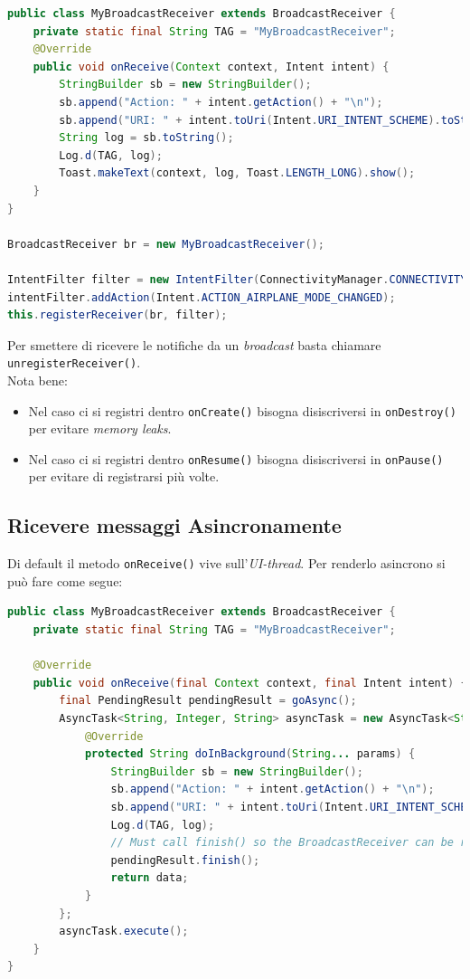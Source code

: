 \documentclass{book}
\begin{document}
\begin{lstlisting}[language=Java]
public class MyBroadcastReceiver extends BroadcastReceiver {
    private static final String TAG = "MyBroadcastReceiver";
    @Override
    public void onReceive(Context context, Intent intent) {
        StringBuilder sb = new StringBuilder();
        sb.append("Action: " + intent.getAction() + "\n");
        sb.append("URI: " + intent.toUri(Intent.URI_INTENT_SCHEME).toString() + "\n");
        String log = sb.toString();
        Log.d(TAG, log);
        Toast.makeText(context, log, Toast.LENGTH_LONG).show();
    }
}

BroadcastReceiver br = new MyBroadcastReceiver();

IntentFilter filter = new IntentFilter(ConnectivityManager.CONNECTIVITY_ACTION);
intentFilter.addAction(Intent.ACTION_AIRPLANE_MODE_CHANGED);
this.registerReceiver(br, filter);
\end{lstlisting}

Per smettere di ricevere le notifiche da un \textit{broadcast} basta chiamare \texttt{unregisterReceiver()}.\\
Nota bene:
\begin{itemize}
	\item Nel caso ci si registri dentro \texttt{onCreate()} bisogna disiscriversi in \texttt{onDestroy()} per evitare \textit{memory leaks}.
	\item Nel caso ci si registri dentro \texttt{onResume()} bisogna disiscriversi in \texttt{onPause()} per evitare di registrarsi più volte.
\end{itemize}


\subsection{Ricevere messaggi Asincronamente}
Di default il metodo \texttt{onReceive()} vive sull'\textit{UI-thread}. Per renderlo asincrono si può fare come segue:

\begin{lstlisting}[language=Java]
public class MyBroadcastReceiver extends BroadcastReceiver {
    private static final String TAG = "MyBroadcastReceiver";

    @Override
    public void onReceive(final Context context, final Intent intent) {
        final PendingResult pendingResult = goAsync();
        AsyncTask<String, Integer, String> asyncTask = new AsyncTask<String, Integer, String>() {
            @Override
            protected String doInBackground(String... params) {
                StringBuilder sb = new StringBuilder();
                sb.append("Action: " + intent.getAction() + "\n");
                sb.append("URI: " + intent.toUri(Intent.URI_INTENT_SCHEME).toString() + "\n");
                Log.d(TAG, log);
                // Must call finish() so the BroadcastReceiver can be recycled.
                pendingResult.finish();
                return data;
            }
        };
        asyncTask.execute();
    }
}
\end{lstlisting}
\end{document}
